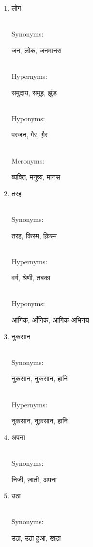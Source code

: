 \documentclass{article}
\begin{document}
\begin{enumerate}
\item \begin{hindi}लोग\end{hindi} \\
Synonyms: \begin{hindi}जन, लोक, जनमानस\end{hindi} \\
Hypernyms: \begin{hindi}समुदाय, समूह, झुंड\end{hindi} \\
Hyponyms: \begin{hindi}परजन, गैर, ग़ैर\end{hindi} \\
Meronyms: \begin{hindi}व्यक्ति, मनुष्य, मानस\end{hindi}

\item \begin{hindi}तरह\end{hindi} \\
Synonyms: \begin{hindi}तरह, किस्म, क़िस्म\end{hindi} \\
Hypernyms: \begin{hindi}वर्ग, श्रेणी, तबका\end{hindi} \\
Hyponyms: \begin{hindi}आंगिक, आँगिक, आंगिक अभिनय\end{hindi}

\item \begin{hindi}नुकसान\end{hindi} \\
Synonyms: \begin{hindi}नुक़सान, नुकसान, हानि\end{hindi} \\
Hypernyms: \begin{hindi}नुकसान, नुक़सान, हानि\end{hindi}

\item \begin{hindi}अपना\end{hindi} \\
Synonyms: \begin{hindi}निजी, ज़ाती, अपना\end{hindi}

\item \begin{hindi}उठा\end{hindi} \\
Synonyms: \begin{hindi}उठा, उठा हुआ, खड़ा\end{hindi}


\end{enumerate}
\end{document}
